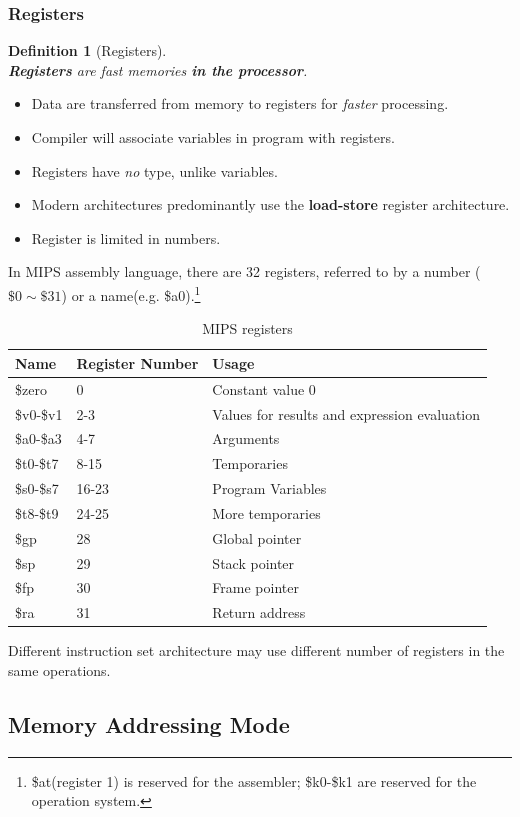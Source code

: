 \documentclass[12pt]{article}
\newtheorem{definition}{Definition}[section]
\theoremstyle{definition}
\begin{document}
\subsubsection{Registers}
\begin{definition}[Registers]\hfill\\\normalfont \textbf{Registers} are fast memories \textbf{in the processor}.
\end{definition}
\begin{itemize}
  \item Data are transferred from memory to registers for \textit{faster} processing.
  \item Compiler will associate variables in program with registers.
  \item Registers have \textit{no} type, unlike variables.
  \item Modern architectures predominantly use the \textbf{load-store} register architecture.
  \item Register is limited in numbers.
\end{itemize}
In MIPS assembly language, there are 32 registers, referred to by a number ($\$ 0\sim \$ 31$) or a name(e.g. \$a0).\footnote{\$at(register 1) is reserved for the assembler; \$k0-\$k1 are reserved for the operation system.}
\clearpage
\begin{table}[h]
\centering
\begin{tabular}{|l|l|p{7cm}|}
\hline
Name&Register Number&Usage\\\hline
\$zero&0&Constant value 0\\\hline
\$v0-\$v1&2-3&Values for results and expression evaluation\\\hline
\$a0-\$a3&4-7&Arguments\\\hline
\$t0-\$t7&8-15&Temporaries\\\hline
\$s0-\$s7&16-23&Program Variables\\\hline
\$t8-\$t9&24-25&More temporaries\\\hline
\$gp&28&Global pointer\\\hline
\$sp&29&Stack pointer\\\hline
\$fp&30&Frame pointer\\\hline
\$ra&31&Return address\\\hline
\end{tabular}
\caption{MIPS registers}
\end{table}
Different instruction set architecture may use different number of registers in the same operations.
\subsection{Memory Addressing Mode}
\end{document}
